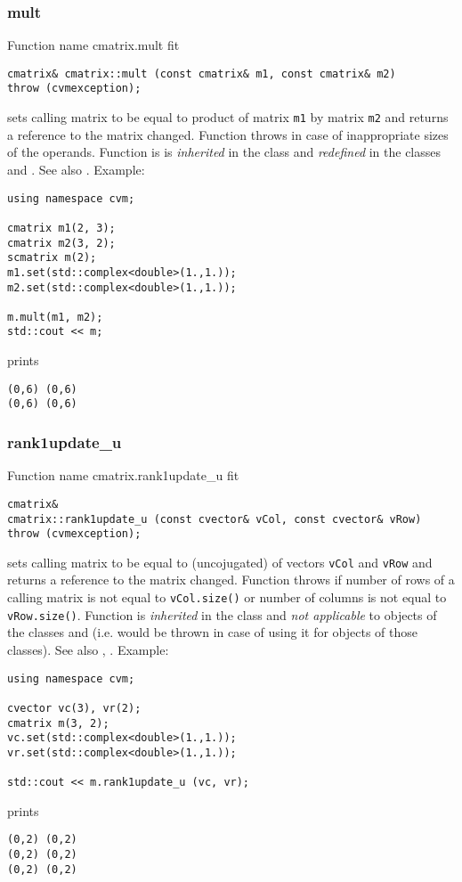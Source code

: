 \subsubsection{mult}
Function%
\pdfdest name {cmatrix.mult} fit
\begin{verbatim}
cmatrix& cmatrix::mult (const cmatrix& m1, const cmatrix& m2)
throw (cvmexception);
\end{verbatim}
sets  calling matrix to be equal to  product of  matrix
\verb"m1" by  matrix \verb"m2"
and returns a reference to
the matrix changed.
Function throws  
in case of inappropriate sizes of the operands.
Function is is \emph{inherited} in the class 
and \emph{redefined} in the classes
and .
See also
.
Example:
\begin{Verbatim}
using namespace cvm;

cmatrix m1(2, 3);
cmatrix m2(3, 2);
scmatrix m(2);
m1.set(std::complex<double>(1.,1.));
m2.set(std::complex<double>(1.,1.));

m.mult(m1, m2);
std::cout << m;
\end{Verbatim}
prints
\begin{Verbatim}
(0,6) (0,6)
(0,6) (0,6)
\end{Verbatim}
\newpage



\subsubsection{rank1update\_u}
Function%
\pdfdest name {cmatrix.rank1update_u} fit
\begin{verbatim}
cmatrix&
cmatrix::rank1update_u (const cvector& vCol, const cvector& vRow)
throw (cvmexception);
\end{verbatim}
sets calling matrix to be equal to 
 (uncojugated) of vectors
\verb"vCol" and \verb"vRow"
and returns a reference to
the matrix changed.
Function throws  
if number of rows of a calling matrix
is not equal to \verb"vCol.size()"
or number of columns is not equal to \verb"vRow.size()".
Function is \emph{inherited} in the class
 and
\emph{not applicable} to objects of the classes
 and
 (i.e. 
 would be thrown
in case of using it for objects of those classes).
See also ,
.
Example:
\begin{Verbatim}
using namespace cvm;

cvector vc(3), vr(2);
cmatrix m(3, 2);
vc.set(std::complex<double>(1.,1.));
vr.set(std::complex<double>(1.,1.));

std::cout << m.rank1update_u (vc, vr);
\end{Verbatim}
prints
\begin{Verbatim}
(0,2) (0,2)
(0,2) (0,2)
(0,2) (0,2)
\end{Verbatim}
\newpage



